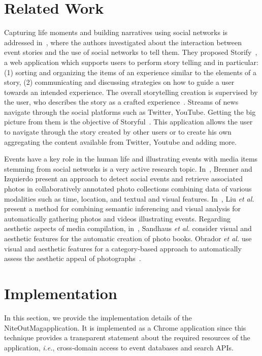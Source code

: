 \documentclass{acm_proc_article-sp}
\let\oldemph\emph
\renewcommand{\emph}[1]{\oldemph{\fontsize{9}{9}\selectfont #1}}
\begin{document}
{\section{Related Work}                                                      \label{sec:related-work}
Capturing life moments and building narratives using social networks is addressed in~\cite{Atosy2011}, where the authors investigated about the interaction between event stories and the use of social networks to tell them. They proposed Storify~\cite{Storify2012}, a web application which supports users to perform story telling and in particular: (1) sorting and organizing the items of an experience similar to the elements of a story, (2) communicating and discussing strategies on how to guide a user towards an intended experience. The overall storytelling creation is supervised by the user, who describes the story as a crafted experience~\cite{Hassenzahl2010}. Streams of news navigate through the social platforms such as Twitter, YouTube. Getting the big picture from them is the objective of Storyful~\cite{Storyful2012}. This application allows the user to navigate through the story created by other users or to create his own aggregating the content available from Twitter, Youtube and adding more.

Events have a key role in the human life and illustrating events with media items stemming from social networks is a very active research topic. In~\cite{Brenner2012}, Brenner and Izquierdo present an approach to detect social events and retrieve associated photos in collaboratively annotated photo collections combining data of various modalities such as time, location, and textual and visual features. In~\cite{Liu2011}, Liu \emph{et al.} present a method for combining semantic inferencing and visual analysis for automatically gathering photos and videos illustrating events. Regarding aesthetic aspects of media compilation, in~\cite{Sandhaus2011}, Sandhaus \emph{et al.} consider visual and aesthetic features for the automatic creation of photo books. Obrador \emph{et al.} use visual and aesthetic features for a category-based approach to automatically assess the aesthetic appeal of photographs~\cite{Obrador2012}.


\section{Implementation}                                                    \label{sec:implementation}
In this section, we provide the implementation details of the NiteOutMag\texttrademark application. It is implemented as a Chrome application since this technique provides a transparent statement about the required resources of the application, \emph{i.e.}, cross-domain access to event databases and search APIs.

}
\end{document}
